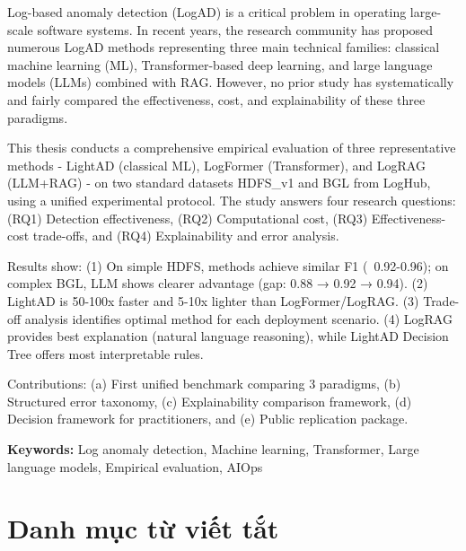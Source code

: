 \documentclass[12pt,a4paper,oneside]{report}
\begin{document}
Log-based anomaly detection (LogAD) is a critical problem in operating large-scale software systems. In recent years, the research community has proposed numerous LogAD methods representing three main technical families: classical machine learning (ML), Transformer-based deep learning, and large language models (LLMs) combined with RAG. However, no prior study has systematically and fairly compared the effectiveness, cost, and explainability of these three paradigms.

This thesis conducts a comprehensive empirical evaluation of three representative methods - LightAD (classical ML), LogFormer (Transformer), and LogRAG (LLM+RAG) - on two standard datasets HDFS\_v1 and BGL from LogHub, using a unified experimental protocol. The study answers four research questions: (RQ1) Detection effectiveness, (RQ2) Computational cost, (RQ3) Effectiveness-cost trade-offs, and (RQ4) Explainability and error analysis.

Results show: (1) On simple HDFS, methods achieve similar F1 (~0.92-0.96); on complex BGL, LLM shows clearer advantage (gap: 0.88 → 0.92 → 0.94). (2) LightAD is 50-100x faster and 5-10x lighter than LogFormer/LogRAG. (3) Trade-off analysis identifies optimal method for each deployment scenario. (4) LogRAG provides best explanation (natural language reasoning), while LightAD Decision Tree offers most interpretable rules.

Contributions: (a) First unified benchmark comparing 3 paradigms, (b) Structured error taxonomy, (c) Explainability comparison framework, (d) Decision framework for practitioners, and (e) Public replication package.

\textbf{Keywords:} Log anomaly detection, Machine learning, Transformer, Large language models, Empirical evaluation, AIOps

\newpage
\tableofcontents

\newpage
\listoffigures
{}

\newpage
\listoftables
{}

\newpage
\chapter*{Danh mục từ viết tắt}
\end{document}

